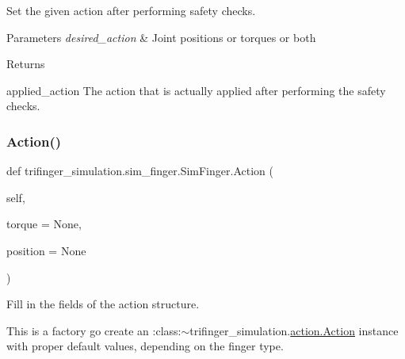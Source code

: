 Set the given action after performing safety checks. 


\begin{DoxyParams}{Parameters}
{\em desired\+\_\+action} & Joint positions or torques or both\\
\hline
\end{DoxyParams}
\begin{DoxyReturn}{Returns}


applied\+\_\+action The action that is actually applied after performing the safety checks. 
\end{DoxyReturn}
\mbox{\label{classtrifinger__simulation_1_1sim__finger_1_1SimFinger_ad5b6ac0efef02c0f3334a44e79bd4413}} 
\subsubsection{\texorpdfstring{Action()}{Action()}}
{\footnotesize\ttfamily def trifinger\+\_\+simulation.\+sim\+\_\+finger.\+Sim\+Finger.\+Action (\begin{DoxyParamCaption}\item[{}]{self,  }\item[{}]{torque = {\ttfamily None},  }\item[{}]{position = {\ttfamily None} }\end{DoxyParamCaption})}



Fill in the fields of the action structure. 

This is a factory go create an \+:class\+:{\ttfamily $\sim$trifinger\+\_\+simulation.\hyperlink{classtrifinger__simulation_1_1action_1_1Action}{action.\+Action}} instance with proper default values, depending on the finger type.


